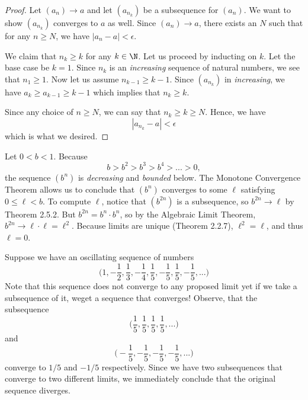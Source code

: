 \begin{proof}
    Let \( (a_n) \to a \) and let \( (a_{n_k})\) be a subsequence for \( (a_n)\). We want to show \( (a_{n_k})\) converges to \( a \) as well. Since \( (a_n) \to a\), there exists an \( N \) such that for any \( n \geq N \), we have \( |a_n - a| < \epsilon \). 

    We claim that \( n_{k} \geq k \) for any \( k \in \N\). Let us proceed by inducting on \( k \). Let the base case be \( k = 1 \). Since \(n_k\) is an \textit{increasing} sequence of natural numbers, we see that \( n_1 \geq 1\). Now let us assume \(n_{k-1} \geq k - 1\). Since \( (a_{n_k})\) in \textit{increasing}, we have \( a_k \geq a_{k-1} \geq k - 1\) which implies that \( n_k \geq k \). 

    Since any choice of \( n \geq N \), we can say that \( n_k \geq k \geq N \). Hence, we have 
    \[ |a_{n_k} - a| < \epsilon \]
which is what we desired.
\end{proof}

\begin{ex}
Let \(0 < b < 1\). Because 
\[ b > b^2 > b^3 > b^4 > ... > 0,\]
the sequence \((b^n)\) is \textit{decreasing} and \textit{bounded} below. The Monotone Convergence Theorem allows us to conclude that \((b^n)\) converges to some \(\ell\) satisfying \( 0 \leq \ell < b\). To compute \(\ell\), notice that \((b^{2n})\) is a subsequence, so \(b^{2n} \to \ell\) by Theorem 2.5.2. But \( b^{2n} = b^n \cdot b^n\), so by the Algebraic Limit Theorem, \(b^{2n} \to \ell \cdot \ell = \ell^2 \). Because limits are unique (Theorem 2.2.7), \( \ell^2 = \ell\), and thus \( \ell = 0\). 
\end{ex}










\begin{ex}
Suppose we have an oscillating sequence of numbers 
\[ \Big( 1, -\frac{1}{2}, \frac{1}{3}, - \frac{1}{4}, \frac{1}{5}, -\frac{1}{5}, \frac{1}{5}, -\frac{1}{5},... \Big)\]
Note that this sequence does not converge to any proposed limit yet if we take a subsequence of it, weget a sequence that converges! Observe, that the subsequence 
\[ \Big(\frac{1}{5}, \frac{1}{5}, \frac{1}{5}, \frac{1}{5},... \Big)\]
and
\[ \Big(-\frac{1}{5}, -\frac{1}{5}, -\frac{1}{5}, -\frac{1}{5},... \Big)\]
converge to \( 1 / 5 \) and \(- 1 / 5\) respectively. Since we have two subsequences that converge to two different limits, we immediately conclude that the original sequence diverges.
\end{ex}

